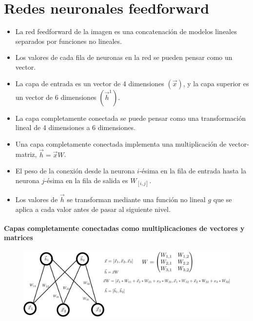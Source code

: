 
\section{Redes neuronales feedforward}

\begin{itemize}
\item La red feedforward de la imagen es una concatenación de modelos lineales separados por funciones no lineales.
\item Los valores de cada fila de neuronas en la red se pueden pensar como un vector.
\item La capa de entrada es un vector de 4 dimensiones $(\vec{x})$, y la capa superior es un vector de 6 dimensiones $(\vec{h}^1)$.
\item La capa completamente conectada se puede pensar como una transformación lineal de 4 dimensiones a 6 dimensiones.
\item Una capa completamente conectada implementa una multiplicación de vector-matriz, $\vec{h}=\vec{x}W$.
\item El peso de la conexión desde la neurona $i$-ésima en la fila de entrada hasta la neurona $j$-ésima en la fila de salida es $W_{[i,j]}$.
\item Los valores de $\vec{h}$ se transforman mediante una función no lineal $g$ que se aplica a cada valor antes de pasar al siguiente nivel.

\end{itemize}


\paragraph{Capas completamente conectadas como multiplicaciones de vectores y matrices}
\begin{figure}[htb]
	\centering
	 \includegraphics[scale=0.65]{pics/neural_net_mat_mul.pdf}
\end{figure}


